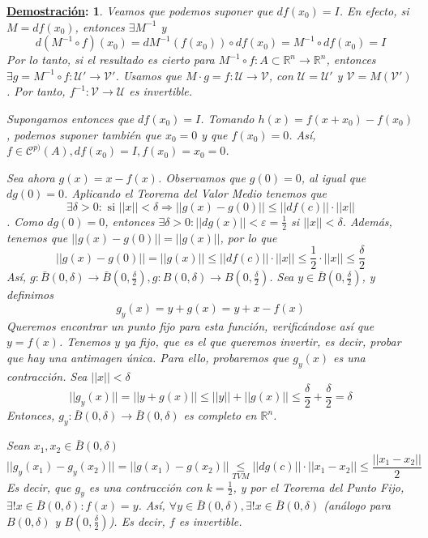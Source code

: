 \documentclass[10pt,a4paper,openright]{book}
\theoremstyle{break}
\newtheorem*{demo}{\underline{Demostración}:}
\begin{document}
\begin{demo}
Veamos que podemos suponer que $df(x_0) = I$. En efecto, si $M = df(x_0)$, entonces $\exists M^{-1}$ y 
$$d(M^{-1} \circ f)(x_0) = dM^{-1}(f(x_0)) \circ df(x_0) = M^{-1} \circ df(x_0) = I$$
Por lo tanto, si el resultado es cierto para $M^{-1} \circ f : A \subset \mathbb{R}^n \to \mathbb{R}^n$, entonces $\exists g = M^{-1} \circ f : \mathcal{U}' \to \mathcal{V}'$. Usamos que $M \cdot g = f : \mathcal{U} \to \mathcal{V}$, con $\mathcal{U} = \mathcal{U}'$ y  $\mathcal{V} = M(\mathcal{V}')$. Por tanto, $f^{-1}: \mathcal{V} \to \mathcal{U}$ es invertible.

Supongamos entonces que $df(x_0) = I$. Tomando $h(x) = f(x + x_0) - f(x_0)$, podemos suponer también que $x_0 = 0$ y que $f(x_0) = 0$. Así, $f \in \mathcal{C}^{p)}(A), df(x_0) = I, f(x_0) = x_0 = 0$.

Sea ahora $g(x) = x - f(x)$. Observamos que $g(0) = 0$, al igual que $dg(0) = 0$. Aplicando el Teorema del Valor Medio tenemos que 
$$\exists \delta > 0 : \mbox{ si } || x || < \delta \Rightarrow || g(x) - g(0) || \leq || df(c) || \cdot || x ||$$.
Como $dg(0) = 0$, entonces $\exists \delta > 0 : || dg(x) || < \varepsilon = \frac{1}{2}$ si $|| x || < \delta$. Además, tenemos que $|| g(x) - g(0) || = || g(x) ||$, por lo que
$$|| g(x) - g(0) || = || g(x) || \leq || df(c) || \cdot || x || \leq \frac{1}{2} \cdot || x || \leq \frac{\delta}{2}$$
Así, $g : \bar{B}(0, \delta) \to \bar{B}(0, \frac{\delta}{2}), g: B(0, \delta) \to B (0, \frac{\delta}{2})$. Sea $y \in \bar{B}(0, \frac{\delta}{2})$, y definimos 
$$g_y (x) = y + g(x) = y + x - f(x)$$
Queremos encontrar un punto fijo para esta función, verificándose así que $y = f(x)$. Tenemos $y$ ya fijo, que es el que queremos invertir, es decir, probar que hay una antimagen única. Para ello, probaremos que $g_y(x)$ es una contracción. Sea $|| x || < \delta$
$$||g_y (x)|| = || y + g(x) || \leq || y || + ||g(x)|| \leq \frac{\delta}{2} + \frac{\delta}{2} = \delta $$
Entonces, $g_y : \bar{B}(0, \delta) \to \bar{B}(0, \delta)$ es completo en $\mathbb{R}^n$.

Sean $x_1, x_2 \in \bar{B}(0,\delta)$
$$|| g_y (x_1) - g_y (x_2) || = ||g(x_1) - g(x_2)|| \underset{TVM}{\leq} || dg(c) || \cdot || x_1 - x_2 || \leq \frac{|| x_1 - x_2 ||}{2}$$
Es decir, que $g_y$ es una contracción con $k = \frac{1}{2}$, y por el Teorema del Punto Fijo, $\exists ! x \in \bar{B}(0, \delta) : f(x) = y$. Así, $\forall y \in \bar{B}(0, \delta), \exists ! x \in \bar{B}(0, \delta)$ (análogo para $B(0, \delta)$ y $B(0, \frac{\delta}{2})$). Es decir, $f$ es invertible.


\end{demo}
\end{document}
